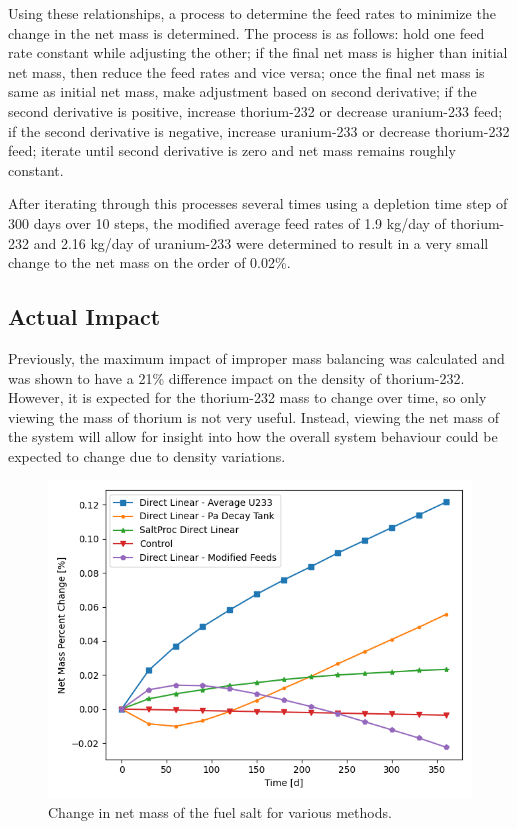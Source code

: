 Using these relationships, a process to determine the feed rates to minimize the change in the net mass is determined. The process is as follows:  hold one feed rate constant while adjusting the other;
if the final net mass is higher than initial net mass, then reduce the feed rates and vice versa;
once the final net mass is same as initial net mass, make adjustment based on second derivative;
if the second derivative is positive, increase thorium-232 or decrease uranium-233 feed;
if the second derivative is negative, increase uranium-233 or decrease thorium-232 feed;
iterate until second derivative is zero and net mass remains roughly constant.

After iterating through this processes several times using a depletion time step of 300 days over 10 steps, the modified average feed rates of 1.9 kg/day of thorium-232 and 2.16 kg/day of uranium-233 were determined to result in a very small change to the net mass on the order of 0.02\%.

\subsection{Actual Impact}

Previously, the maximum impact of improper mass balancing was calculated and was shown to have a 21\% difference impact on the density of thorium-232. However, it is expected for the thorium-232 mass to change over time, so only viewing the mass of thorium is not very useful. Instead, viewing the net mass of the system will allow for insight into how the overall system behaviour could be expected to change due to density variations.

\begin{figure}[H]
  \centering
  \includegraphics[scale=0.7]{images/net-mass-pcnt-change.png}
  \caption{Change in net mass of the fuel salt for various methods.}
   \label{fig:net-mass-bal}
\end{figure}

